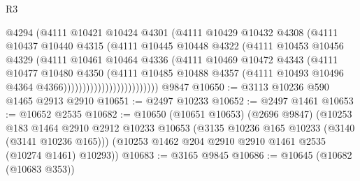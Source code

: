 \begin{lexlean}{R3}
\begin{coremodule}
                                  @4294
                                  (@4111
                                    @10421
                                    @10424
                                    @4301
                                    (@4111
                                      @10429
                                      @10432
                                      @4308
                                      (@4111
                                        @10437
                                        @10440
                                        @4315
                                        (@4111
                                          @10445
                                          @10448
                                          @4322
                                          (@4111
                                            @10453
                                            @10456
                                            @4329
                                            (@4111
                                              @10461
                                              @10464
                                              @4336
                                              (@4111
                                                @10469
                                                @10472
                                                @4343
                                                (@4111
                                                  @10477
                                                  @10480
                                                  @4350
                                                  (@4111
                                                    @10485
                                                    @10488
                                                    @4357
                                                    (@4111
                                                      @10493
                                                      @10496
                                                      @4364
                                                      @4366)))))))))))))))))))))))))
    @9847
@10650 := @3113 @10236 @590 @1465 @2913 @2910
@10651 := @2497 @10233
@10652 := @2497 @1461
@10653 := @10652 @2535
@10682 := @10650
    (@10651 @10653)
    (@2696 @9847)
    (@10253
      @183
      @1464
      @2910
      @2912
      @10233
      @10653
      (@3135 @10236 @165 @10233 (@3140 (@3141 @10236 @165)))
      (@10253 @1462 @204 @2910 @2910 @1461 @2535 (@10274 @1461) @10293))
@10683 := @3165 @9845
@10686 := @10645 (@10682 (@10683 @353))

\end{coremodule}
\end{lexlean}
